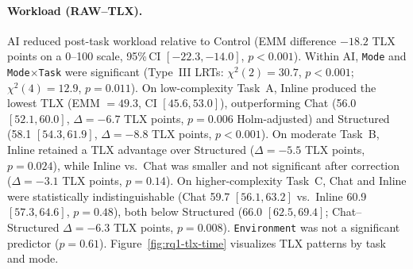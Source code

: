 \documentclass[sigconf]{acmart}
\begin{document}
\paragraph{Workload (RAW--TLX).}
AI reduced post-task workload relative to Control (EMM difference ${-}18.2$ TLX points on a 0--100 scale, 95\%\,CI $[{-}22.3, {-}14.0]$, $p<0.001$). Within AI, \texttt{Mode} and \texttt{Mode$\times$Task} were significant (Type~III LRTs: $\chi^2(2){=}30.7$, $p<0.001$; $\chi^2(4){=}12.9$, $p{=}0.011$). On low-complexity Task~A, Inline produced the lowest TLX (EMM $=49.3$, CI $[45.6, 53.0]$), outperforming Chat (56.0 $[52.1, 60.0]$, $\Delta{=}{-}6.7$ TLX points, $p{=}0.006$ Holm-adjusted) and Structured (58.1 $[54.3, 61.9]$, $\Delta{=}{-}8.8$ TLX points, $p<0.001$). On moderate Task~B, Inline retained a TLX advantage over Structured ($\Delta{=}{-}5.5$ TLX points, $p{=}0.024$), while Inline vs.\ Chat was smaller and not significant after correction ($\Delta{=}{-}3.1$ TLX points, $p{=}0.14$). On higher-complexity Task~C, Chat and Inline were statistically indistinguishable (Chat 59.7 $[56.1, 63.2]$ vs.\ Inline 60.9 $[57.3, 64.6]$, $p{=}0.48$), both below Structured (66.0 $[62.5, 69.4]$; Chat--Structured $\Delta{=}{-}6.3$ TLX points, $p{=}0.008$). \texttt{Environment} was not a significant predictor ($p{=}0.61$). Figure~\ref{fig:rq1-tlx-time} visualizes TLX patterns by task and mode.
\end{document}
